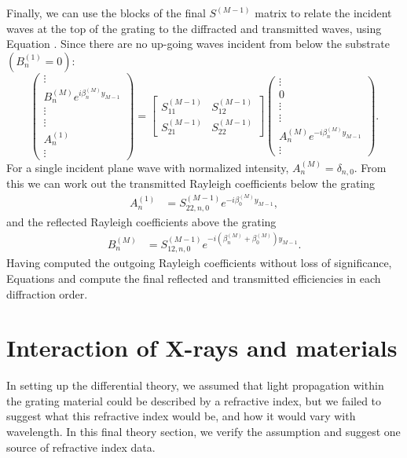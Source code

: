 Finally, we can use the blocks of the final $S^{(M-1)}$ matrix to relate the incident waves at the top of the grating to the diffracted and transmitted waves, using Equation . Since there are no up-going waves incident from below the substrate $(B_n^{(1)} = 0)$:
\begin{equation}
 \left(\begin{array}{c}\vdots \\ B^{(M)}_n  e^{i \beta^{(M)}_n y_{M-1}} \\ \vdots \\\hline \vdots \\ A^{(1)}_n \\ \vdots\end{array}\right) =            \left[\begin{array}{c|c}S^{(M-1)}_{11} & S^{(M-1)}_{12} \\\hline S^{(M-1)}_{21} & S^{(M-1)}_{22}\end{array}\right]       \left(\begin{array}{c}\vdots \\ 0  \\ \vdots \\\hline \vdots \\ A^{(M)}_n e^{-i \beta^{(M)}_n y_{M-1}} \\ \vdots\end{array}\right) .
 \label{sMatrixDef}
\end{equation}
For a single incident plane wave with normalized intensity, $A_n^{(M)} = \delta_{n,0}$.  From this we can work out the transmitted Rayleigh coefficients below the grating
\begin{align}
A_n^{(1)} &= S_{22,n,0}^{(M-1)} e^{-i \beta_0^{(M)}y_{M-1}},
\end{align}
and the reflected Rayleigh coefficients above the grating
\begin{align}
B_n^{(M)} &= S_{12,n,0}^{(M-1)} e^{-i (\beta_n^{(M)} + \beta_0^{(M)}) y_{M-1}}.
\end{align}
Having computed the outgoing Rayleigh coefficients without loss of significance, Equations  and  compute the final reflected and transmitted efficiencies in each diffraction order.

\section{Interaction of X-rays and materials}
In setting up the differential theory, we assumed that light propagation within the grating material could be described by a refractive index, but we failed to suggest what this refractive index would be, and how it would vary with wavelength.  In this final theory section, we verify the assumption and suggest one source of refractive index data.

